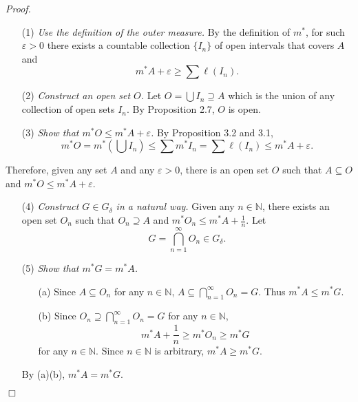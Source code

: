 \documentclass{article}
\begin{document}
\emph{Proof.}
\begin{enumerate}
\item[(1)]
  \emph{Use the definition of the outer measure.}
  By the definition of $m^{*}$,
  for such $\varepsilon > 0$ there exists a countable collection
  $\{ I_n \}$ of open intervals that covers $A$ and
  $$m^{*} A + \varepsilon \geq \sum \ell(I_n).$$

\item[(2)]
  \emph{Construct an open set $O$.}
  Let $O = \bigcup I_n \supseteq A$
  which is the union of any collection of open sets $I_n$.
  By Proposition 2.7, $O$ is open.

\item[(3)]
  \emph{Show that $m^{*}O \leq m^{*}A + \varepsilon$.}
  By Proposition 3.2 and 3.1,
  \[
    m^{*}O
    = m^{*} \left( \bigcup I_n \right)
    \leq \sum m^{*} I_n
    = \sum \ell(I_n)
    \leq m^{*} A + \varepsilon.
  \]
\end{enumerate}
Therefore, given any set $A$ and any $\varepsilon > 0$,
there is an open set $O$ such that $A \subseteq O$
and $m^{*}O \leq m^{*}A + \varepsilon$.

\begin{enumerate}
\item[(4)]
  \emph{Construct $G \in G_{\delta}$ in a natural way.}
  Given any $n \in \mathbb{N}$, there exists an open set $O_n$
  such that $O_n \supseteq A$ and $m^{*}O_n \leq m^{*}A + \frac{1}{n}$.
  Let
  \[
    G = \bigcap_{n=1}^{\infty} O_n \in G_{\delta}.
  \]

\item[(5)]
\emph{Show that $m^{*}G = m^{*}A$.}
  \begin{enumerate}
  \item[(a)]
    Since $A \subseteq O_n$ for any $n \in \mathbb{N}$,
    $A \subseteq \bigcap_{n=1}^{\infty} O_n = G$.
    Thus $m^{*}A \leq m^{*}G$.

  \item[(b)]
    Since $O_n \supseteq \bigcap_{n=1}^{\infty} O_n = G$ for any $n \in \mathbb{N}$,
    \[
      m^{*}A + \frac{1}{n} \geq m^{*}O_n \geq m^{*}G
    \]
    for any $n \in \mathbb{N}$.
    Since $n \in \mathbb{N}$ is arbitrary, $m^{*}A \geq m^{*}G$.
  \end{enumerate}
By (a)(b), $m^{*}A = m^{*}G$.
\end{enumerate}
$\Box$ \\\\



\end{document}
